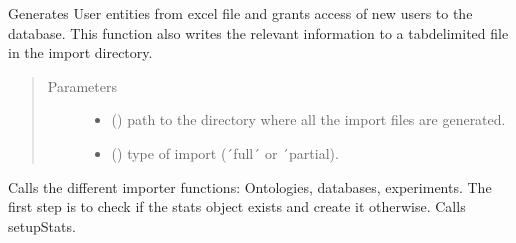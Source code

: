 \documentclass[letterpaper,10pt,english]{sphinxmanual}
\begin{document}
\begin{fulllineitems}
\label{\detokenize{_autosummary/graphdb_builder.builder:graphdb_builder.builder.importer.usersImport}}
Generates User entities from excel file and grants access of new users to the database.
This function also writes the relevant information to a tab\sphinxhyphen{}delimited file in the import     directory.
\begin{quote}\begin{description}
\item[{Parameters}] \leavevmode\begin{itemize}
\item {} 
 () \textendash{} path to the directory where all the import files are generated.

\item {} 
 () \textendash{} type of import (´full´ or ´partial).

\end{itemize}

\end{description}\end{quote}

\end{fulllineitems}


\begin{fulllineitems}
\label{\detokenize{_autosummary/graphdb_builder.builder:graphdb_builder.builder.importer.fullImport}}
Calls the different importer functions: Ontologies, databases,     experiments. The first step is to check if the stats object exists     and create it otherwise. Calls setupStats.

\end{fulllineitems}
\end{document}
